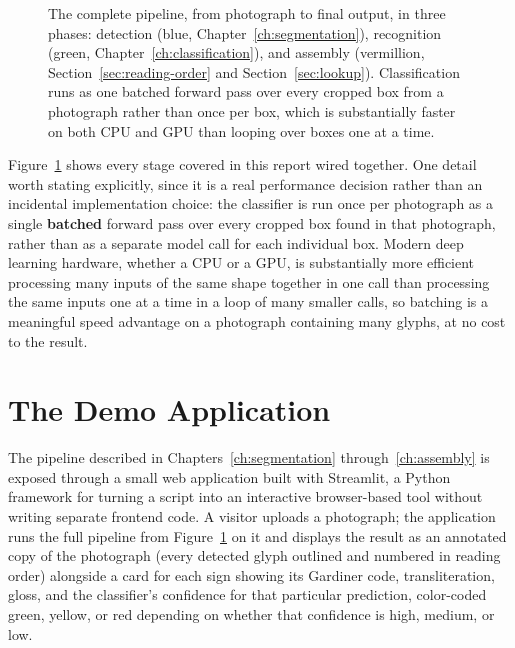 \documentclass[11pt,a4paper]{report}
\begin{document}
\begin{figure}[t]
\caption{The complete pipeline, from photograph to final output, in three
phases: detection (blue, Chapter~\ref{ch:segmentation}), recognition (green,
Chapter~\ref{ch:classification}), and assembly (vermillion,
Section~\ref{sec:reading-order} and Section~\ref{sec:lookup}). Classification
runs as one batched forward pass over every cropped box from a photograph
rather than once per box, which is substantially faster on both CPU and GPU
than looping over boxes one at a time.}
\label{fig:full-pipeline}
\end{figure}

Figure~\ref{fig:full-pipeline} shows every stage covered in this report
wired together. One detail worth stating explicitly, since it is a real
performance decision rather than an incidental implementation choice: the
classifier is run once per photograph as a single \textbf{batched} forward
pass over every cropped box found in that photograph, rather than as a
separate model call for each individual box. Modern deep learning hardware,
whether a CPU or a GPU, is substantially more efficient processing many
inputs of the same shape together in one call than processing the same
inputs one at a time in a loop of many smaller calls, so batching is a
meaningful speed advantage on a photograph containing many glyphs, at no
cost to the result.

\chapter{The Demo Application}
\label{ch:demo}

The pipeline described in Chapters~\ref{ch:segmentation}
through~\ref{ch:assembly} is exposed through a small web application built
with Streamlit, a Python framework for turning a script into an interactive
browser-based tool without writing separate frontend code. A visitor uploads
a photograph; the application runs the full pipeline from
Figure~\ref{fig:full-pipeline} on it and displays the result as an annotated
copy of the photograph (every detected glyph outlined and numbered in
reading order) alongside a card for each sign showing its Gardiner code,
transliteration, gloss, and the classifier's confidence for that particular
prediction, color-coded green, yellow, or red depending on whether that
confidence is high, medium, or low.
\end{document}
